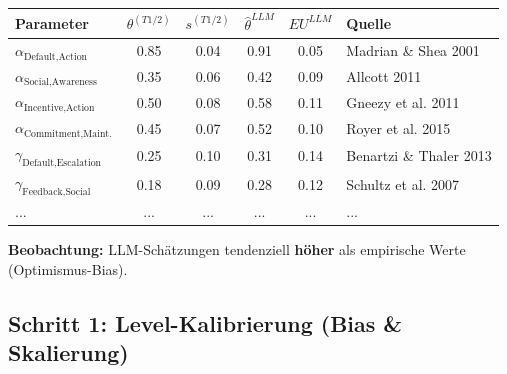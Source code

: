 \begin{tcolorbox}[colback=yellow!5!white, colframe=yellow!75!black,
    title=\textbf{Beispiel: Kalibrations-Set für HHH}]

\renewcommand{\arraystretch}{1.2}
\begin{center}
\begin{tabular}{@{}lccccl@{}}
\toprule
\textbf{Parameter} & $\theta^{(T1/2)}$ & $s^{(T1/2)}$ & $\hat{\theta}^{LLM}$ & $EU^{LLM}$ & \textbf{Quelle} \\
\midrule
$\alpha_{\text{Default,Action}}$ & 0.85 & 0.04 & 0.91 & 0.05 & Madrian \& Shea 2001 \\
$\alpha_{\text{Social,Awareness}}$ & 0.35 & 0.06 & 0.42 & 0.09 & Allcott 2011 \\
$\alpha_{\text{Incentive,Action}}$ & 0.50 & 0.08 & 0.58 & 0.11 & Gneezy et al. 2011 \\
$\alpha_{\text{Commitment,Maint.}}$ & 0.45 & 0.07 & 0.52 & 0.10 & Royer et al. 2015 \\
$\gamma_{\text{Default,Escalation}}$ & 0.25 & 0.10 & 0.31 & 0.14 & Benartzi \& Thaler 2013 \\
$\gamma_{\text{Feedback,Social}}$ & 0.18 & 0.09 & 0.28 & 0.12 & Schultz et al. 2007 \\
... & ... & ... & ... & ... & ... \\
\bottomrule
\end{tabular}
\end{center}

\textbf{Beobachtung:} LLM-Schätzungen tendenziell \textbf{höher} als empirische Werte (Optimismus-Bias).

\end{tcolorbox}

\subsection{Schritt 1: Level-Kalibrierung (Bias \& Skalierung)}

